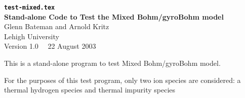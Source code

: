 %
%
\headheight 0pt \headsep 0pt  \topmargin 0pt  \textheight 9.0in
\oddsidemargin 0pt \textwidth 6.5in


\begin{center}
{\bf {\tt test-mixed.tex} \\
Stand-alone Code to Test the Mixed Bohm/gyroBohm model } \\
\vspace{1pc}  Glenn Bateman and Arnold Kritz \\
Lehigh University \\
Version 1.0$\quad$ 22 August 2003
\end{center}

This is a stand-alone program to test Mixed Bohm/gyroBohm model.

For the purposes of this test program, only two ion species are
considered: a thermal hydrogen species and thermal impurity species

